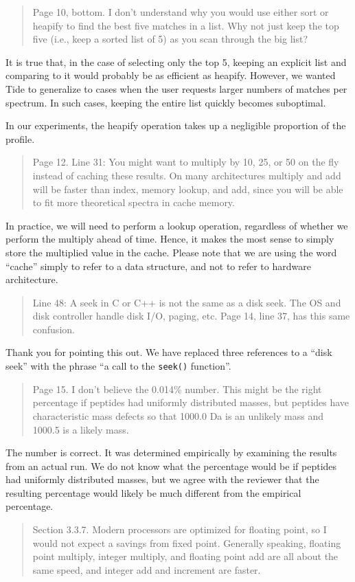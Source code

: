 \documentclass{article}
\newcommand{\breview}{\begin{quotation}\begin{em}\noindent}
\newcommand{\ereview}{\end{em}\end{quotation}}
\begin{document}
\breview Page 10, bottom. I don't understand why you would use either
sort or heapify to find the best five matches in a list. Why not just
keep the top five (i.e., keep a sorted list of 5) as you scan through
the big list? \ereview

It is true that, in the case of selecting only the top 5, keeping an
explicit list and comparing to it would probably be as efficient as
heapify.  However, we wanted Tide to generalize to cases when the user
requests larger numbers of matches per spectrum.  In such cases,
keeping the entire list quickly becomes suboptimal.

In our experiments, the heapify operation takes up a negligible
proportion of the profile.

\breview Page 12. Line 31: You might want to multiply by 10, 25, or 50
on the fly instead of caching these results. On many architectures
multiply and add will be faster than index, memory lookup, and add,
since you will be able to fit more theoretical spectra in cache
memory. \ereview

In practice, we will need to perform a lookup operation, regardless of
whether we perform the multiply ahead of time.  Hence, it makes the
most sense to simply store the multiplied value in the cache.  Please
note that we are using the word ``cache'' simply to refer to a data
structure, and not to refer to hardware architecture.

\breview Line 48: A seek in C or C++ is not the same as a disk
seek. The OS and disk controller handle disk I/O, paging, etc. Page
14, line 37, has this same confusion. \ereview

Thank you for pointing this out.  We have replaced three references to
a ``disk seek'' with the phrase ``a call to the {\tt seek()} function''.

\breview Page 15. I don't believe the 0.014\% number. This might be
the right percentage if peptides had uniformly distributed masses, but
peptides have characteristic mass defects so that 1000.0 Da is an
unlikely mass and 1000.5 is a likely mass.  \ereview

The number is correct.  It was determined empirically by examining the
results from an actual run.  We do not know what the percentage would
be if peptides had uniformly distributed masses, but we agree with the
reviewer that the resulting percentage would likely be much different
from the empirical percentage.

\breview Section 3.3.7. Modern processors are optimized for floating
point, so I would not expect a savings from fixed point. Generally
speaking, floating point multiply, integer multiply, and floating
point add are all about the same speed, and integer add and increment
are faster. \ereview
\end{document}
